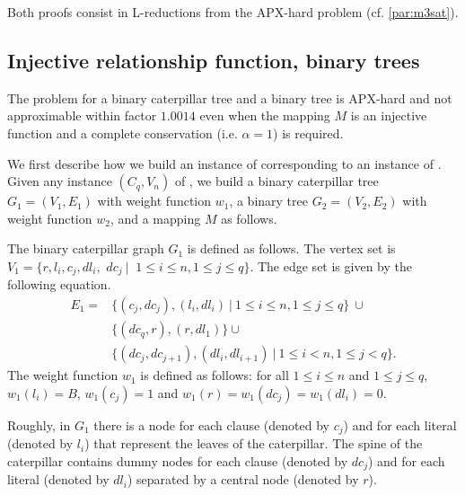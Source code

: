 		Both proofs consist in L-reductions from the APX-hard \msat{} problem (cf. \cref{par:m3sat}).


		\subsection{Injective relationship function, binary trees}
		\label{subsec:apx-bt-cater}

		\begin{proposition}\label{sec:apx-bt-cater-proof}
			The \mwccs{} problem for a binary caterpillar tree and a binary tree is APX-hard and not approximable within factor $1.0014$ even when the mapping $M$ is an injective function and a complete conservation (i.e. $\alpha = 1$) is required.
		\end{proposition}

		We first describe how we build an instance of \mwccs{} corresponding to an instance of \msat{}. Given any instance $(C_q,V_n)$ of \msat{}, we build a binary caterpillar tree $G_1=(V_1,E_1)$ with weight function $w_1$, a binary tree $G_2=(V_2,E_2)$ with weight function $w_2$, and a mapping $M$ as follows.

		The binary caterpillar graph $G_1$ is defined as follows. The vertex set is $V_1=\{r, l_i, c_j, dl_i, $ $dc_j ~\vert~$ $ 1\leq i\leq n, 1\leq j \leq q\}$. The edge set is given by the following equation.
		\begin{align*}
		E_1= &\{(c_j,dc_j), (l_i,dl_i) ~\vert~ 1\leq i\leq n, 1\leq j \leq q\}~\cup \\
		&\{(dc_q,r), (r,dl_1)\} \cup \\
		& \{(dc_j,dc_{j+1}), (dl_i,dl_{i+1}) ~\vert~ 1\leq i< n, 1\leq j < q\}.
		\end{align*}
		The weight function $w_1$ is defined as follows: for all $1 \leq i\leq n$ and $1\leq j \leq q$, $w_1(l_i)=B$, $w_1(c_j)=1$ and $w_1(r)=w_1(dc_j)=w_1(dl_i)=0$.

		Roughly, in $G_1$ there is a node for each clause (denoted by $c_j$) and for each literal (denoted by $l_i$) that represent the leaves of the caterpillar. The spine of the caterpillar contains dummy nodes for each clause (denoted by $dc_j$) and for each literal (denoted by $dl_i$) separated by a central node (denoted by $r$).

